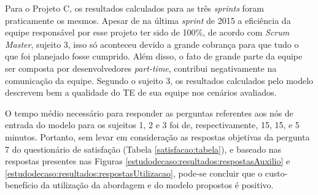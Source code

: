 Para o Projeto C, os resultados calculados para as três \textit{sprints} foram praticamente os mesmos. Apesar de na última \textit{sprint} de 2015 a eficiência da equipe responsável por esse projeto ter sido de 100\%, de acordo com \textit{Scrum Master}, sujeito 3, isso só aconteceu devido a grande cobrança para que tudo o que foi planejado fosse cumprido. Além disso, o fato de grande parte da equipe ser composta por desenvolvedores \textit{part-time}, contribui negativamente na comunicação da equipe. Segundo o sujeito 3, os resultados calculados pelo modelo descrevem bem a qualidade do TE de sua equipe nos cenários avaliados.

O tempo médio necessário para responder as perguntas referentes aos nós de entrada do modelo para os sujeitos 1, 2 e 3 foi de, respectivamente, 15, 15, e 5 minutos. Portanto, sem levar em consideração as respostas objetivas da pergunta 7 do questionário de satisfação (Tabela \ref{satisfacao:tabela}), e baseado nas respostas presentes nas Figuras \ref{estudodecaso:resultados:respostasAuxilio} e \ref{estudodecaso:resultados:respostasUtilizacao}, pode-se concluir que o custo-benefício da utilização da abordagem e do modelo propostos é positivo.
